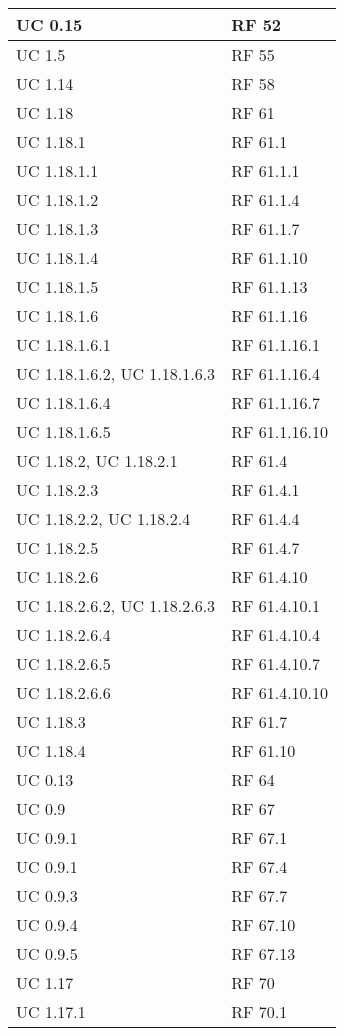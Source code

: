 {\begin{longtable} [c]{| p{4cm} | p{4cm} |}
 \hline 
UC 0.15 & RF 52\\ 
 \hline 
UC 1.5 & RF 55\\ 
 \hline 
UC 1.14 & RF 58\\ 
 \hline 
UC 1.18 & RF 61\\ 
 \hline 
UC 1.18.1 & RF 61.1\\ 
 \hline 
UC 1.18.1.1 & RF 61.1.1\\ 
 \hline 
UC 1.18.1.2 & RF 61.1.4\\ 
 \hline 
UC 1.18.1.3 & RF 61.1.7\\ 
 \hline 
UC 1.18.1.4 & RF 61.1.10\\ 
 \hline 
UC 1.18.1.5 & RF 61.1.13\\ 
 \hline 
UC 1.18.1.6 & RF 61.1.16\\ 
 \hline 
UC 1.18.1.6.1 & RF 61.1.16.1\\ 
 \hline 
UC 1.18.1.6.2, UC 1.18.1.6.3 & RF 61.1.16.4\\ 
 \hline 
UC 1.18.1.6.4 & RF 61.1.16.7\\ 
 \hline 
UC 1.18.1.6.5 & RF 61.1.16.10\\ 
 \hline 
UC 1.18.2, UC 1.18.2.1 & RF 61.4\\ 
 \hline 
UC 1.18.2.3 & RF 61.4.1\\ 
 \hline 
UC 1.18.2.2, UC 1.18.2.4 & RF 61.4.4\\ 
 \hline 
UC 1.18.2.5 & RF 61.4.7\\ 
 \hline 
UC 1.18.2.6 & RF 61.4.10\\ 
 \hline 
UC 1.18.2.6.2, UC 1.18.2.6.3 & RF 61.4.10.1\\ 
 \hline 
UC 1.18.2.6.4 & RF 61.4.10.4\\ 
 \hline 
UC 1.18.2.6.5 & RF 61.4.10.7\\ 
 \hline 
UC 1.18.2.6.6 & RF 61.4.10.10\\ 
 \hline 
UC 1.18.3 & RF 61.7\\ 
 \hline 
UC 1.18.4 & RF 61.10\\ 
 \hline 
UC 0.13 & RF 64\\ 
 \hline 
UC 0.9 & RF 67\\ 
 \hline 
UC 0.9.1 & RF 67.1\\ 
 \hline 
UC 0.9.1 & RF 67.4\\ 
 \hline 
UC 0.9.3 & RF 67.7\\ 
 \hline 
UC 0.9.4 & RF 67.10\\ 
 \hline 
UC 0.9.5 & RF 67.13\\ 
 \hline 
UC 1.17 & RF 70\\ 
 \hline 
UC 1.17.1 & RF 70.1\\ 

\end{longtable}}
